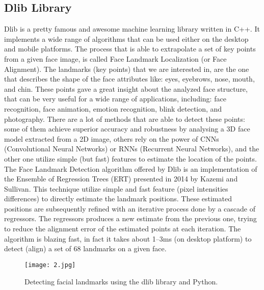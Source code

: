 \documentclass{article}
\begin{document}
\subsection{Dlib Library}
\par{Dlib is a pretty famous and awesome machine learning library written in C++. It implements a wide range of algorithms that can be used either on the desktop and mobile platforms. The process that is able to extrapolate a set of key points from a given face image, is called Face Landmark Localization (or Face Alignment). The landmarks (key points) that we are interested in, are the one that describes the shape of the face attributes like: eyes, eyebrows, nose, mouth, and chin. These points gave a great insight about the analyzed face structure, that can be very useful for a wide range of applications, including: face recognition, face animation, emotion recognition, blink detection, and photography. There are a lot of methods that are able to detect these points: some of them achieve superior accuracy and robustness by analysing a 3D face model extracted from a 2D image, others rely on the power of CNNs (Convolutional Neural Networks) or RNNs (Recurrent Neural Networks), and the other one utilize simple (but fast) features to estimate the location of the points. The Face Landmark Detection algorithm offered by Dlib is an implementation of the Ensemble of Regression Trees (ERT) presented in 2014 by Kazemi and Sullivan. This technique utilize simple and fast feature (pixel intensities differences) to directly estimate the landmark positions. These estimated positions are subsequently refined with an iterative process done by a cascade of regressors. The regressors produces a new estimate from the previous one, trying to reduce the alignment error of the estimated points at each iteration. The algorithm is blazing fast, in fact it takes about 1–3ms (on desktop platform) to detect (align) a set of 68 landmarks on a given face.}
\begin{figure}[H]
    \centering
    \texttt{[image: 2.jpg]}
    \caption{ Detecting facial landmarks using the dlib library and Python.}
    \label{simulationfigure}
\end{figure}
\end{document}
